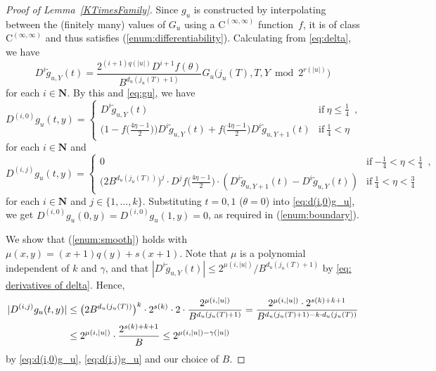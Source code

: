 \documentclass[12pt,a4paper]{article}
\theoremstyle{definition}
\theoremstyle{remark}
\newcommand{\N}{\mathbf N}
\newcommand{\D}{D}
\newcommand{\classC}{\mathrm C}
\begin{document}
\begin{proof}[Proof of Lemma~\ref{KTimesFamily}]
Since $g _u$ is constructed by interpolating between 
the (finitely many) values of $G _u$ 
using a $\classC^{(\infty, \infty)}$ function~$f$, 
it is of class $\classC^{(\infty, \infty)}$ 
and thus satisfies (\ref{enum:differentiability}).
Calculating from \eqref{eq:delta}, 
we have 
\begin{equation}
 \label{eq: derivatives of delta}
    \D^i \tilde g_{u,Y}(t) 
    = \frac{2^{(i+1)q(|u|)} \D^{i+1}f(\theta)}{B^{d_u(j_u(T)+1)}}
    G_u\bigl( j_u(T), T, Y \bmod 2^{r(|u|)} \bigr) 
\end{equation}
for each $i \in \N$. 
By this and \eqref{eq:gu}, 
we have
\begin{equation}
     \D^{(i, 0)} g_u(t, y)
     = \begin{cases}
 	\D^i \tilde g_{u, Y}(t) 
	& \text{if} \ \eta \le \frac 1 4 \enspace , 
	\\
	\bigl( 1-f \bigl( \frac{4\eta-1}{2} \bigr) \bigr) 
	\D^i \tilde g_{u, Y}(t)
	+ f \bigl( \frac{4\eta-1}{2} \bigr) \D^i \tilde g_{u,Y+1}(t) 
	& \text{if} \ \frac 1 4 < \eta 
       \end{cases} \label{eq:d(i,0)g_u}
\end{equation}
for each $i \in \N$ and 
  \begin{equation} \label{eq:d(i,j)g_u}
    \D^{(i, j)} g_u(t, y)
     = \begin{cases}
	0 & \text{if} \ {-\frac 1 4} < \eta < \frac 1 4 \enspace , \\
	\bigl( 2B^{d_u(j_u(T))} \bigr)^j \cdot \D^j f \bigl( \frac{4\eta - 1}2 \bigr) \cdot
	(\D^i \tilde g_{u,Y+1}(t)-\D^i \tilde g_{u, Y}(t)) 
	& \text{if} \ \frac 1 4 < \eta < \frac 3 4 
       \end{cases}
  \end{equation}
for each $i \in \N$ and $j \in \{1, \dots, k\}$. 
Substituting $t = 0, 1$ ($\theta = 0$) into \eqref{eq:d(i,0)g_u},
we get $\D^{(i, 0)} g_u(0,y) = \D^{(i, 0)} g_u(1,y) = 0$, 
as required in (\ref{enum:boundary}).

We show that (\ref{enum:smooth}) holds with $\mu(x, y) = (x+1)q(y) + s(x+1)$.
Note that $\mu$ is a polynomial independent of $k$ and $\gamma$, 
and that $
 |\D^i \tilde g_{u,Y}(t)| 
\leq
 2 ^{\mu (i, \lvert u \rvert)} / B ^{d _u (j _u (T) + 1)}
$ by \eqref{eq: derivatives of delta}. 
Hence, 
\begin{align}
\label{equation: upperbound of differences}
  |\D^{(i,j)} g _u (t, y)| 
&
 \le 
    \bigl( 2 B^{d_u (j _u (T))} \bigr) ^k \cdot 2^{s(k)}
   \cdot 
    2 \cdot \frac{2 ^{\mu (i, \lvert u \rvert)}}{B ^{d _u (j _u (T) + 1)}} 
 =
   \frac{2 ^{\mu (i, \lvert u \rvert)} \cdot 2^{s(k) + k + 1}}{B ^{d _u (j _u (T) + 1) - k \cdot d _u (j _u (T))}} 
\notag
\\
&
 \le
   2 ^{\mu (i, \lvert u \rvert)} \cdot \frac{2^{s(k) + k + 1}}{B}
 \le
   2^{\mu(i, |u|) - \gamma(|u|)}
\end{align}
by \eqref{eq:d(i,0)g_u}, \eqref{eq:d(i,j)g_u} and our choice of $B$.


\end{proof}
\end{document}
